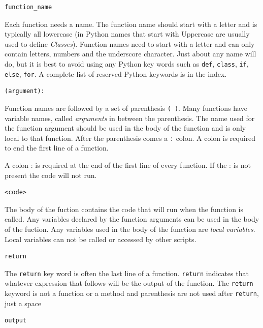\documentclass{book}
\begin{document}
\begin{lstlisting}
function_name
\end{lstlisting}

Each function needs a name. The function name should start with a letter
and is typically all lowercase (in Python names that start with
Uppercase are usually used to define \emph{Classes}). Function names
need to start with a letter and can only contain letters, numbers and
the underscore character. Just about any name will do, but it is best to
avoid using any Python key words such as \lstinline!def!,
\lstinline!class!, \lstinline!if!, \lstinline!else!, \lstinline!for!. A
complete list of reserved Python keywords is in the index.

\begin{lstlisting}
(argument):
\end{lstlisting}

Function names are followed by a set of parenthesis \lstinline!( )!.
Many functions have variable names, called \emph{arguments} in between
the parenthesis. The name used for the function argument should be used
in the body of the function and is only local to that function. After
the parenthesis comes a \lstinline!:! colon. A colon is required to end
the first line of a function.

A colon : is required at the end of the first line of every function. If
the : is not present the code will not run.

\begin{lstlisting}
<code>
\end{lstlisting}

The body of the fuction contains the code that will run when the
function is called. Any variables declared by the function arguments can
be used in the body of the fuction. Any variables used in the body of
the function are \emph{local variables}. Local variables can not be
called or accessed by other scripts.

\begin{lstlisting}
return
\end{lstlisting}

The \lstinline!return! key word is often the last line of a function.
\lstinline!return! indicates that whatever expression that follows will
be the output of the function. The \lstinline!return! keyword is not a
function or a method and parenthesis are not used after
\lstinline!return!, just a space

\begin{lstlisting}
output
\end{lstlisting}
\end{document}
